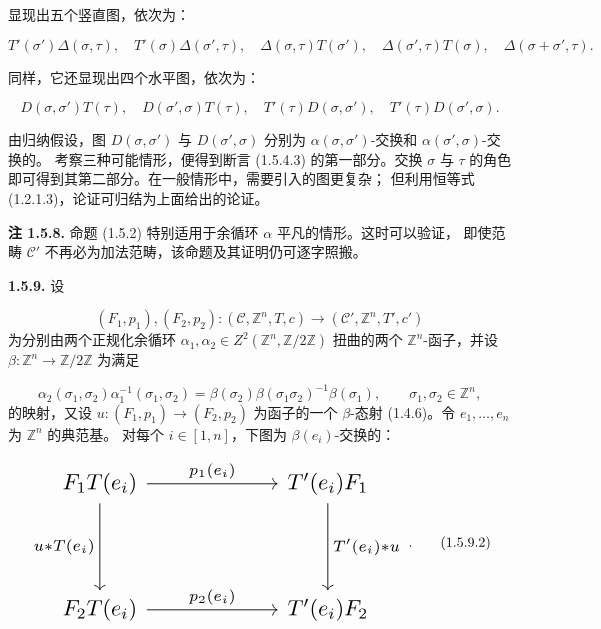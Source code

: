 \clearpage
{}%
显现出五个竖直图，依次为：

\[
  T'(\sigma')\Delta(\sigma,\tau),\quad
  T'(\sigma)\Delta(\sigma',\tau),\quad
  \Delta(\sigma,\tau)T(\sigma'),\quad
  \Delta(\sigma',\tau)T(\sigma),\quad
  \Delta(\sigma+\sigma',\tau).
\]

同样，它还显现出四个水平图，依次为：

\[
  D(\sigma,\sigma')T(\tau),\quad
  D(\sigma',\sigma)T(\tau),\quad
  T'(\tau)D(\sigma,\sigma'),\quad
  T'(\tau)D(\sigma',\sigma).
\]

由归纳假设，图 $D(\sigma,\sigma')$ 与 $D(\sigma',\sigma)$ 分别为
$\alpha(\sigma,\sigma')$-交换和 $\alpha(\sigma',\sigma)$-交换的。
考察三种可能情形，便得到断言 (1.5.4.3) 的第一部分。交换 $\sigma$ 与
$\tau$ 的角色即可得到其第二部分。在一般情形中，需要引入的图更复杂；
但利用恒等式 (1.2.1.3)，论证可归结为上面给出的论证。

\noindent\textbf{注 1.5.8.}\quad
命题 (1.5.2) 特别适用于余循环 $\alpha$ 平凡的情形。这时可以验证，
即使范畴 $\mathcal C'$ 不再必为加法范畴，该命题及其证明仍可逐字照搬。

\noindent\textbf{1.5.9.}\quad
设

\[
  (F_1,p_1),(F_2,p_2)\colon
  (\mathcal C,\mathbb Z^n,T,c)
  \longrightarrow
  (\mathcal C',\mathbb Z^n,T',c')
\]
为分别由两个正规化余循环
$\alpha_1,\alpha_2\in Z^2(\mathbb Z^n,\mathbb Z/2\mathbb Z)$
扭曲的两个 $\mathbb Z^n$-函子，并设
$\beta\colon\mathbb Z^n\to\mathbb Z/2\mathbb Z$ 为满足

\begin{equation}
  \alpha_2(\sigma_1,\sigma_2)\alpha_1^{-1}(\sigma_1,\sigma_2)
  =\beta(\sigma_2)\beta(\sigma_1\sigma_2)^{-1}\beta(\sigma_1),
  \qquad \sigma_1,\sigma_2\in\mathbb Z^n,
  \tag{1.5.9.1}
\end{equation}
的映射，又设 $u\colon(F_1,p_1)\to(F_2,p_2)$ 为函子的一个
$\beta$-态射 (1.4.6)。令 $e_1,\ldots,e_n$ 为 $\mathbb Z^n$ 的典范基。
对每个 $i\in[1,n]$，下图为 $\beta(e_i)$-交换的：

\begin{equation}
  \resizebox{0.78\textwidth}{!}{%
    $\begin{tikzcd}[ampersand replacement=\&,column sep=6em,row sep=4em]
      F_1T(e_i)
        \arrow[r,"{p_1(e_i)}"]
        \arrow[d,"{u*T(e_i)}"']
        \& T'(e_i)F_1
          \arrow[d,"{T'(e_i)*u}"] \\
      F_2T(e_i)
        \arrow[r,"{p_2(e_i)}"]
        \& T'(e_i)F_2
    \end{tikzcd}$%
  }\;.
  \tag{1.5.9.2}
\end{equation}
